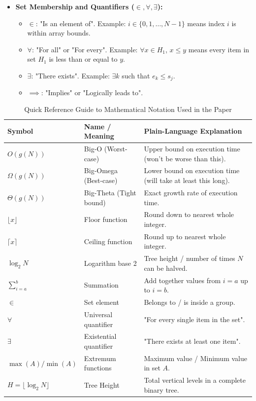 \documentclass[10pt,journal,compsoc,onecolumn]{IEEEtran}
\begin{document}
\begin{itemize}
    \item \textbf{Set Membership and Quantifiers ($\in, \forall, \exists$):}
    \begin{itemize}
        \item $\in$: "Is an element of". Example: $i \in \{0, 1, \dots, N-1\}$ means index $i$ is within array bounds.
        \item $\forall$: "For all" or "For every". Example: $\forall x \in H_1$, $x \le y$ means every item in set $H_1$ is less than or equal to $y$.
        \item $\exists$: "There exists". Example: $\exists k$ such that $e_k \le s_j$.
        \item $\implies$: "Implies" or "Logically leads to".
    \end{itemize}
\end{itemize}

\begin{table}[htbp]
\centering
\caption{Quick Reference Guide to Mathematical Notation Used in the Paper}
\label{tab:math-symbols}
\begin{tabular}{lll}
\toprule
\textbf{Symbol} & \textbf{Name / Meaning} & \textbf{Plain-Language Explanation} \\
\midrule
$O(g(N))$ & Big-O (Worst-case) & Upper bound on execution time (won't be worse than this). \\
$\Omega(g(N))$ & Big-Omega (Best-case) & Lower bound on execution time (will take at least this long). \\
$\Theta(g(N))$ & Big-Theta (Tight bound) & Exact growth rate of execution time. \\
$\lfloor x \rfloor$ & Floor function & Round down to nearest whole integer. \\
$\lceil x \rceil$ & Ceiling function & Round up to nearest whole integer. \\
$\log_2 N$ & Logarithm base 2 & Tree height / number of times $N$ can be halved. \\
$\sum_{i=a}^{b}$ & Summation & Add together values from $i=a$ up to $i=b$. \\
$\in$ & Set element & Belongs to / is inside a group. \\
$\forall$ & Universal quantifier & "For every single item in the set". \\
$\exists$ & Existential quantifier & "There exists at least one item". \\
$\max(A) / \min(A)$ & Extremum functions & Maximum value / Minimum value in set $A$. \\
$H = \lfloor \log_2 N \rfloor$ & Tree Height & Total vertical levels in a complete binary tree. \\
\bottomrule
\end{tabular}
\end{table}
\end{document}
